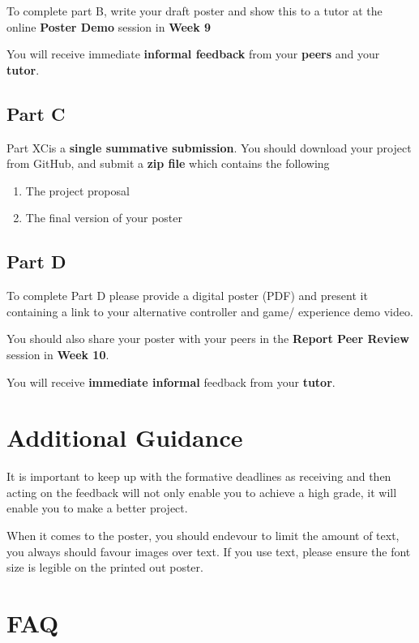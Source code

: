 \documentclass{../../fal_assignment}
\begin{document}
To complete part B, write your draft poster and show this to a tutor at the online \textbf{Poster Demo} session in \textbf{Week 9}

You will receive immediate \textbf{informal feedback} from your \textbf{peers} and your \textbf{tutor}.

\subsection*{Part C}

Part XCis a \textbf{single summative submission}. You should download your project from GitHub, and submit a \textbf{zip file} which contains the following

	\begin{enumerate}
	\item The project proposal
	\item The final version of your poster
	\end{enumerate}

\subsection*{Part D}

	To complete Part D please provide a digital poster (PDF) and present it containing a link to your alternative controller and game/ experience demo video.
	
	You should also share your poster with your peers in the \textbf{Report Peer Review} session in \textbf{Week 10}. 

	You will receive \textbf{immediate informal} feedback from your \textbf{tutor}.

\section*{Additional Guidance}
It is important to keep up with the formative deadlines as receiving and then acting on the feedback 
will not only enable you to achieve a high grade, it will enable you to make a better project. 

When it comes to the poster, you should endevour to limit the amount of text, 
you always should favour images over text. If you use text, please ensure the 
font size is legible on the printed out poster.

\section*{FAQ}
\end{document}
